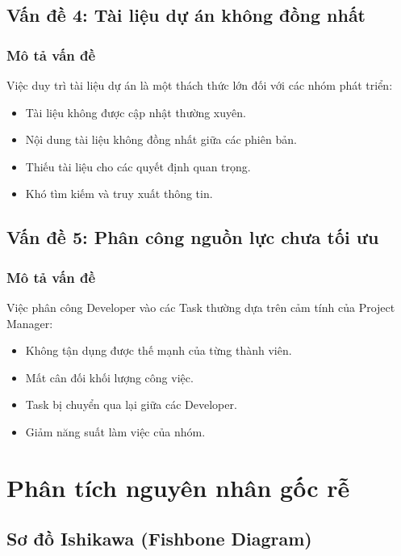 \documentclass[12pt,a4paper]{report}
\begin{document}
\subsection{Vấn đề 4: Tài liệu dự án không đồng nhất}

\subsubsection{Mô tả vấn đề}

Việc duy trì tài liệu dự án là một thách thức lớn đối với các nhóm phát triển:

\begin{itemize}
\item Tài liệu không được cập nhật thường xuyên.
\item Nội dung tài liệu không đồng nhất giữa các phiên bản.
\item Thiếu tài liệu cho các quyết định quan trọng.
\item Khó tìm kiếm và truy xuất thông tin.
\end{itemize}

\subsection{Vấn đề 5: Phân công nguồn lực chưa tối ưu}

\subsubsection{Mô tả vấn đề}

Việc phân công Developer vào các Task thường dựa trên cảm tính của Project Manager:

\begin{itemize}
\item Không tận dụng được thế mạnh của từng thành viên.
\item Mất cân đối khối lượng công việc.
\item Task bị chuyển qua lại giữa các Developer.
\item Giảm năng suất làm việc của nhóm.
\end{itemize}

\section{Phân tích nguyên nhân gốc rễ}

\subsection{Sơ đồ Ishikawa (Fishbone Diagram)}
\end{document}
